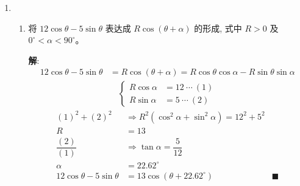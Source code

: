 \documentclass{report}
\newcommand{\sol}{\vspace{0.2cm}\textbf{解}:}
\begin{document}
\begin{enumerate}[leftmargin=*]
        \sol{}
        \begin{align*}
            \sin ^2 x-\cos ^2 x &= 1+\dfrac{1}{2} \sin 2 x\\
            -\cos 2x &= 1 + \dfrac{1}{2}\sin 2x\\
            -2\cos 2x &= 2 + \sin 2x
        \end{align*}
        \newpage
        Let $u = 2x$.
        \begin{align*}
            -2\cos u &= 2 + \sin u\\
            \sin u + 2\cos u &= -2
        \end{align*}
        Let $\tan\dfrac{u}{2} = t$, then $\cos u = \dfrac{1 - t^2}{1 + t^2}$ and $\sin u = \dfrac{2t}{1 + t^2}$.
        \begin{align*}
            \dfrac{2t}{1 + t^2} + 2\left(\dfrac{1 - t^2}{1 + t^2}\right) &= -2\\
            2t &= -4\\
            t &= -2\\
            \tan\dfrac{u}{2} &= -2\\
            \tan x &= -2\\
            x &= k\pi - \arctan 2 \quad \text{where } k \in \mathbb{Z}
        \end{align*}
        

        \item \begin{enumerate}
            \item 将 $12 \cos \theta-5 \sin \theta$ 表达成 $R \cos (\theta+\alpha)$ 的形成, 式中 $R>0$ 及 $0^{\circ}<\alpha<90^{\circ}$。
            
            \sol{}
            \begin{align*}
                12 \cos \theta-5 \sin \theta &= R\cos(\theta + \alpha) = R\cos\theta\cos\alpha - R\sin\theta\sin\alpha
            \end{align*}
            \begin{align*}
                \begin{cases}
                    R\cos\alpha &= 12\ \cdots\ (1)\\
                    R\sin\alpha &= 5\ \cdots\ (2)
                \end{cases}
            \end{align*}
            \begin{align*}
                (1)^2 + (2)^2 &\Rightarrow R^2(\cos^2\alpha + \sin^2\alpha) = 12^2 + 5^2\\
                R &= 13\\
                \dfrac{(2)}{(1)} &\Rightarrow \tan\alpha = \dfrac{5}{12}\\
                \alpha &= 22.62^{\circ}\\
                12 \cos \theta-5 \sin \theta &= 13\cos(\theta + 22.62^{\circ}) & \blacksquare
            \end{align*}
            

\end{enumerate}
\end{enumerate}
\end{document}
